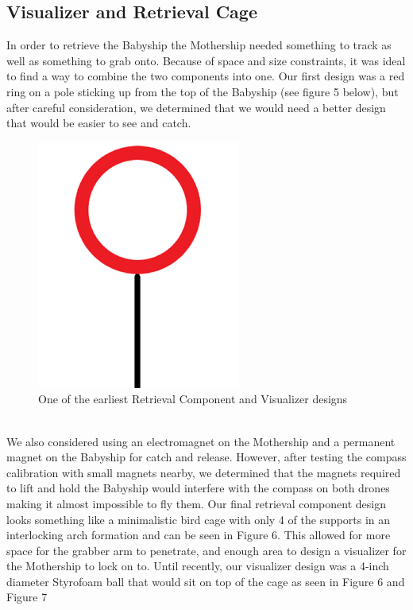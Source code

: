 \documentclass[11pt]{article}
\begin{document}
\subsection{Visualizer and Retrieval Cage}
In order to retrieve the Babyship the Mothership needed something to track as well as something to grab onto. Because of space and size constraints, it was ideal to find a way to combine the two components into one.  Our first design was a red ring on a pole sticking up from the top of the Babyship (see figure 5 below), but after careful consideration, we determined that we would need a better design that would be easier to see and catch.\\
\begin{figure}[htp]
    \centering
    \includegraphics[scale=0.3]{Visualizer_Cage.png}
    \caption{One of the earliest Retrieval Component and Visualizer designs}
\end{figure}\\
We also considered using an electromagnet on the Mothership and a permanent magnet on the Babyship for catch and release. However, after testing the compass calibration with small magnets nearby, we determined that the magnets required to lift and hold the Babyship would interfere with the compass on both drones making it almost impossible to fly them. Our final retrieval component design looks something like a minimalistic bird cage with only 4 of the supports in an interlocking arch formation and can be seen in Figure 6. This allowed for more space for the grabber arm to penetrate, and enough area to design a visualizer for the Mothership to lock on to. Until recently, our visualizer design was a 4-inch diameter Styrofoam ball that would sit on top of the cage as seen in Figure 6 and Figure 7
\end{document}
